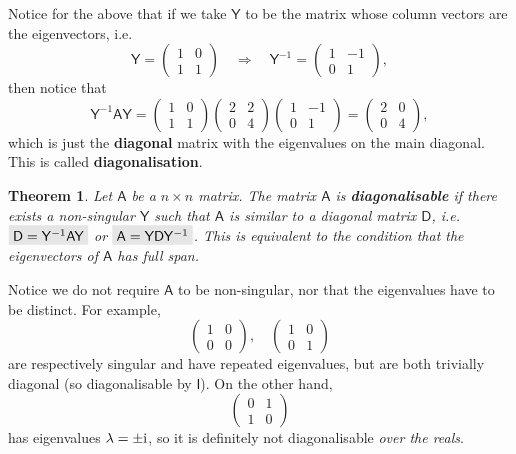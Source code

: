 \documentclass[letter-paper]{tufte-book}
\newtheorem{theorem}{\color{pastel-blue}Theorem}[section]
\newcommand{\zi}{{\rm i}}
\newcommand{\As}{{\mathsf{A}}}
\newcommand{\Ds}{{\mathsf{D}}}
\newcommand{\Is}{{\mathsf{I}}}
\newcommand{\Ys}{{\mathsf{Y}}}
\newcommand{\highlight}[1]{\mathchoice%
  {\colorbox{black!10}{$\displaystyle#1$}}%
  {\colorbox{black!10}{$\textstyle#1$}}%
  {\colorbox{black!10}{$\scriptstyle#1$}}%
  {\colorbox{black!10}{$\scriptscriptstyle#1$}}}%
\begin{document}
Notice for the above that if we take $\Ys$ to be the matrix whose column vectors
are the eigenvectors, i.e.
\begin{equation*}
  \Ys = \begin{pmatrix}1 & 0 \\ 1 & 1\end{pmatrix} \quad \Rightarrow \quad \Ys^{-1} = \begin{pmatrix}1 & -1 \\ 0 & 1\end{pmatrix},
\end{equation*}
then notice that 
\begin{equation*}
  \Ys^{-1} \As \Ys = \begin{pmatrix}1 & 0 \\ 1 & 1\end{pmatrix}\begin{pmatrix}2 & 2 \\ 0 & 4\end{pmatrix}\begin{pmatrix}1 & -1 \\ 0 & 1\end{pmatrix} = \begin{pmatrix}2 & 0 \\ 0 & 4\end{pmatrix},
\end{equation*}
which is just the \textbf{diagonal} matrix with the eigenvalues on the main
diagonal. This is called \textbf{diagonalisation}.

\begin{theorem}
  Let $\As$ be a $n\times n$ matrix. The matrix $\As$ is \textbf{diagonalisable}
  if there exists a non-singular $\Ys$ such that $\As$ is similar to a diagonal
  matrix $\Ds$, i.e. $\highlight{\Ds = \Ys^{-1} \As \Ys}$ or $\highlight{\As =
  \Ys \Ds\Ys^{-1}}$. This is equivalent to the condition that the eigenvectors
  of $\As$ has full span.
\end{theorem}

Notice we do not require $\As$ to be non-singular, nor that the eigenvalues have
to be distinct. For example,
\begin{equation*}
  \begin{pmatrix}1 & 0 \\ 0 & 0\end{pmatrix}, \quad \begin{pmatrix}1 & 0 \\ 0 & 1\end{pmatrix}
\end{equation*}
are respectively singular and have repeated eigenvalues, but are both trivially
diagonal (so diagonalisable by $\Is$). On the other hand,
\begin{equation*}
  \begin{pmatrix}0 & 1 \\ 1 & 0\end{pmatrix}
\end{equation*}
has eigenvalues $\lambda = \pm \zi$, so it is definitely not diagonalisable
\emph{over the reals}.
\end{document}
